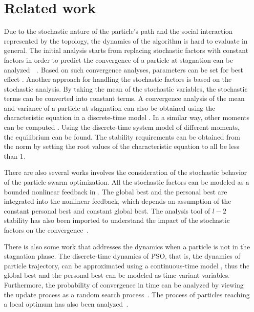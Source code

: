 \section{Related work}
\label{sec:rel_work}

Due to the stochastic nature of the particle's path and the social interaction represented by the topology, the dynamics of the algorithm is hard to evaluate in general.
The initial analysis starts from replacing stochastic factors with constant factors in order to predict the convergence of a particle at stagnation can be analyzed~\cite{985692}~\cite{4424687}.
Based on such convergence analyses, parameters can be set for best effect \cite{Trelea2003317}.
Another approach for handling the stochastic factors is based on the stochastic analysis.
By taking the mean of the stochastic variables, the stochastic terms can be converted into
constant terms.
A convergence analysis of the mean and variance of a particle at stagnation can also be obtained using the characteristic equation in a discrete-time model 
\cite{Jiang20078}.
In a similar way, 
other moments can be computed
\cite{5175367,Poli:2007:EAS:1276958.1276977,Poli:2008:DSS:1384929.1384944}.
Using the discrete-time system model of different moments, the equilibrium can be found.
The stability requirements can be obtained from the norm by setting the root values of the characteristic equation to all be less than 1.

There are also several works involves the consideration of the stochastic behavior of the particle swarm optimization.
All the stochastic factors can be modeled as a bounded nonlinear feedback in \cite{1637686}.
The global best and the personal best are integrated into the nonlinear feedback, which depends an assumption of the constant personal best and constant global best.
The analysis tool of $ l-2 $ stability has also been imported to understand the impact of the stochastic factors on the convergence~\cite{5160341}.

There is also some work that addresses the dynamics when a particle is not in the stagnation phase.
The discrete-time dynamics of PSO, that is, the dynamics of particle trajectory, can be approximated
using a continuous-time model
\cite{5675669}, thus the global best and the personal best can be modeled as time-variant variables.
Furthermore, the probability of convergence in time can be analyzed by viewing the update process as a random search process~\cite{vandenBergh:2010:CPP:2010420.2010421}.
The process of particles reaching a local optimum has also been analyzed~\cite{Schmitt:2013:PSO:2463372.2463563}.

